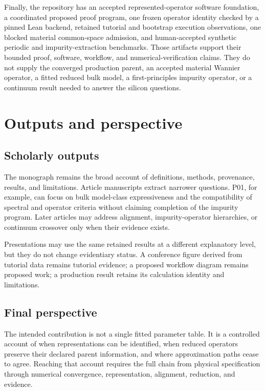 Finally, the repository has an accepted represented-operator software
foundation, a coordinated proposed proof program, one frozen operator identity
checked by a pinned Lean backend, retained tutorial and bootstrap execution
observations, one blocked material common-space admission, and human-accepted
synthetic periodic and impurity-extraction benchmarks. Those artifacts support
their bounded proof, software, workflow, and numerical-verification claims.
They do not supply the converged production parent, an accepted material
Wannier operator, a fitted reduced bulk model, a first-principles impurity
operator, or a continuum result needed to answer the silicon questions.

\section{Outputs and perspective}

\subsection{Scholarly outputs}


The monograph remains the broad account of definitions, methods, provenance,
results, and limitations. Article manuscripts extract narrower questions.
P01, for example, can focus on bulk model-class expressiveness and the
compatibility of spectral and operator criteria without claiming completion of
the impurity program. Later articles may address alignment, impurity-operator
hierarchies, or continuum crossover only when their evidence exists.

Presentations may use the same retained results at a different explanatory
level, but they do not change evidentiary status. A conference figure derived
from tutorial data remains tutorial evidence; a proposed workflow diagram
remains proposed work; a production result retains its calculation identity and
limitations.

\subsection{Final perspective}

The intended contribution is not a single fitted parameter table. It is a
controlled account of when representations can be identified, when reduced
operators preserve their declared parent information, and where approximation
paths cease to agree. Reaching that account requires the full chain from
physical specification through numerical convergence, representation,
alignment, reduction, and evidence.

